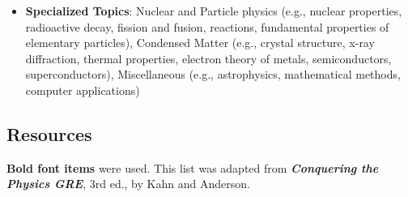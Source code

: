 \begin{itemize}
    \item {\bfseries Specialized Topics}: Nuclear and Particle physics (e.g., nuclear properties, radioactive decay, fission and fusion, reactions, fundamental properties of elementary particles), Condensed Matter (e.g., crystal structure, x-ray diffraction, thermal properties, electron theory of metals, semiconductors, superconductors), Miscellaneous (e.g., astrophysics, mathematical methods, computer applications)
\end{itemize}

\subsection{Resources}

{\bfseries Bold font items} were used. This list was adapted from {\itshape \bfseries Conquering the Physics GRE}, 3rd ed., by Kahn and Anderson.

